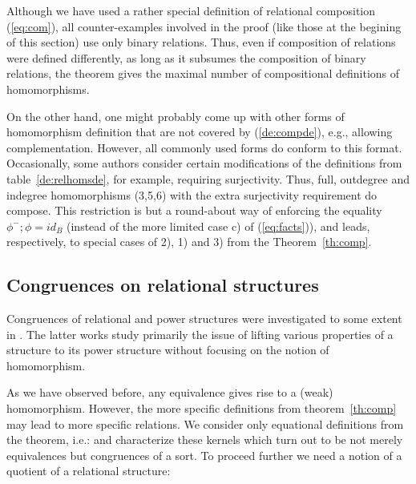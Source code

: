 \documentclass[10pt]{article}
\begin{document}
\noindent
Although we have used a rather special definition of
relational composition (\ref{eq:com}), all counter-examples involved in 
the proof (like those at the begining of this section)
use only binary relations. Thus, even if composition of relations were defined
differently, as long as it subsumes the composition of binary
relations, the theorem gives the maximal number of compositional
definitions of homomorphisms.

On the other hand, one might probably come up with other forms of
homomorphism definition  that are not covered by (\ref{de:compde}), e.g., allowing
complementation. However, all
commonly used forms do
conform to this format. Occasionally, some authors consider certain
modifications of the definitions from table~\ref{de:relhomsde},
for example, requiring surjectivity. Thus, full, outdegree
and indegree homomorphisms (3,5,6) with the extra surjectivity
requirement do compose.  This restriction is but a round-about way of
enforcing the equality $\phi^-;\phi=id_B$ (instead of the more limited
case c) of (\ref{eq:facts})), and leads, respectively, to special cases of 2),
1) and 3) from the Theorem~\ref{th:comp}.



\subsection{Congruences on relational structures}
\label{sub:congrel}

Congruences of relational and power structures %
were investigated to some extent
in \cite{relhoms, brink93, brink97}. The latter works study primarily the issue
of lifting various properties of a structure to its power structure
without focusing on the notion of homomorphism.

As we have observed
before, any equivalence gives rise to a (weak) homomorphism.
However, the more specific definitions from theorem~\ref{th:comp} may
lead to more specific relations. We consider only equational
definitions from the theorem, i.e.: 
and characterize these kernels which turn out to be not merely
equivalences but congruences of a sort. To proceed further we need a
notion of a quotient of a relational structure:
\end{document}
